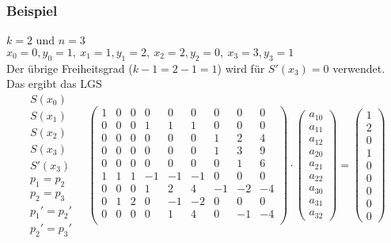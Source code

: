 \begin{frame}\frametitle{Beispiel}
$k=2$ und $n=3$\\\vfill
$x_0=0, y_0=1, \ x_1=1, y_1=2, \ x_2=2, y_2=0, \ x_3=3, y_3=1$\\
Der übrige Freiheitsgrad ($k-1=2-1=1$) wird für $S'(x_3)=0$ verwendet. Das ergibt das LGS
\small
$$
\begin{array}{l} S(x_0) \\ S(x_1)\\S(x_2)\\S(x_3)\\S'(x_3) \\ p_1=p_2 \\ p_2=p_3 \\ p_1'=p_2'\\ p_2'=p_3' \end{array}\quad
\left(\begin{array}{rrr|rrr|rrr}
1&0&0&0&0&0&0&0&0\\
0&0&0&1&1&1&0&0&0\\
0&0&0&0&0&0&1&2&4\\
0&0&0&0&0&0&1&3&9\\
0&0&0&0&0&0&0&1&6\\
1&1&1&-1&-1&-1&0&0&0\\
0&0&0&1&2&4&-1&-2&-4\\
0&1&2&0&-1&-2&0&0&0\\
0&0&0&0&1&4&0&-1&-4\\
\end{array}\right)\cdot \begin{pmatrix} a_{10}\\a_{11}\\a_{12}\\a_{20}\\a_{21}\\a_{22}\\a_{30}\\a_{31}\\a_{32}\end{pmatrix}  = \begin{pmatrix}1\\2\\0\\1\\0\\0\\0\\0\\0 \end{pmatrix}
$$
\end{frame}
%
